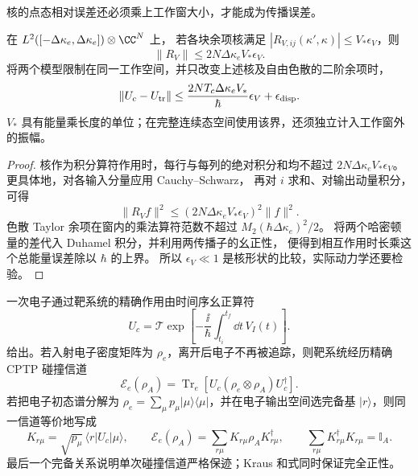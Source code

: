 核的点态相对误差还必须乘上工作窗大小，才能成为传播误差。
\begin{proposition}[有限动量窗内的转移核近似]
在 $L^2([-\Delta\kappa_e,\Delta\kappa_e])\otimes\CC^N$ 上，
若各块余项核满足 $|R_{V,ij}(\kappa',\kappa)|\le V_*\epsilon_V$，则
\[
\|R_V\|\le2N\Delta\kappa_e V_*\epsilon_V.
\]
将两个模型限制在同一工作空间，并只改变上述核及自由色散的二阶余项时，
\begin{equation}
\|U_c-U_{\rm tr}\|
\le\frac{2N T_c\Delta\kappa_e V_*}{\hbar}\epsilon_V+\epsilon_{\rm disp}.
\label{eq:collision-transfer-kernel-error}
\end{equation}
$V_*$ 具有能量乘长度的单位；在完整连续态空间使用该界，还须独立计入工作窗外的振幅。
\end{proposition}
\begin{proof}
核作为积分算符作用时，每行与每列的绝对积分和均不超过
$2N\Delta\kappa_e V_*\epsilon_V$。更具体地，对各输入分量应用 Cauchy--Schwarz，
再对 $i$ 求和、对输出动量积分，可得
\[
\|R_Vf\|^2\le(2N\Delta\kappa_e V_*\epsilon_V)^2\|f\|^2.
\]
色散 Taylor 余项在窗内的乘法算符范数不超过
$M_2(\hbar\Delta\kappa_e)^2/2$。
将两个哈密顿量的差代入 Duhamel 积分，并利用两传播子的幺正性，
便得到相互作用时长乘这个总能量误差除以 $\hbar$ 的上界。
所以 $\epsilon_V\ll1$ 是核形状的比较，实际动力学还要检验。
\end{proof}

一次电子通过靶系统的精确作用由时间序幺正算符
\begin{equation}
{
U_c=\mathcal T\exp\!\left[-\frac{\ii}{\hbar}\int_{t_i}^{t_f}\dd t\,V_I(t)\right].}
\label{eq:general_collision_exact_unitary}
\end{equation}
给出。若入射电子密度矩阵为 $\rho_e$，离开后电子不再被追踪，则靶系统经历精确 CPTP 碰撞信道
\begin{equation}
{
\mathscr E_e(\rho_A)
=\operatorname{Tr}_e[U_c(\rho_e\otimes\rho_A)U_c^\dagger].}
\label{eq:general_electron_target_cptp_map}
\end{equation}
若把电子初态谱分解为 $\rho_e=\sum_\mu p_\mu|\mu\rangle\langle\mu|$，并在电子输出空间选完备基 $|r\rangle$，则同一信道等价地写成
\begin{equation}
{
K_{r\mu}=\sqrt{p_\mu}\,\langle r|U_c|\mu\rangle,
\qquad
\mathscr E_e(\rho_A)=\sum_{r\mu}K_{r\mu}\rho_AK_{r\mu}^\dagger,
\qquad
\sum_{r\mu}K_{r\mu}^\dagger K_{r\mu}=\mathbb I_A.}
\label{eq:general_collision_kraus_representation}
\end{equation}
最后一个完备关系说明单次碰撞信道严格保迹；Kraus 和式同时保证完全正性。

